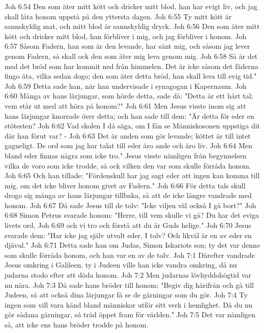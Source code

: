 Joh 6:54  Den som äter mitt kött och dricker mitt blod, han har evigt liv, och jag skall låta honom uppstå på den yttersta dagen.
Joh 6:55  Ty mitt kött är sannskyldig mat, och mitt blod är sannskyldig dryck.
Joh 6:56  Den som äter mitt kött och dricker mitt blod, han förbliver i mig, och jag förbliver i honom.
Joh 6:57  Såsom Fadern, han som är den levande, har sänt mig, och såsom jag lever genom Fadern, så skall ock den som äter mig leva genom mig.
Joh 6:58  Så är det med det bröd som har kommit ned från himmelen. Det är icke såsom det fäderna fingo äta, vilka sedan dogo; den som äter detta bröd, han skall leva till evig tid."
Joh 6:59  Detta sade han, när han undervisade i synagogan i Kapernaum.
Joh 6:60  Många av hans lärjungar, som hörde detta, sade då: "Detta är ett hårt tal; vem står ut med att höra på honom?"
Joh 6:61  Men Jesus visste inom sig att hans lärjungar knorrade över detta; och han sade till dem: "Är detta för eder en stötesten?
Joh 6:62  Vad skolen I då säga, om I fån se Människosonen uppstiga dit där han förut var? -
Joh 6:63  Det är anden som gör levande; köttet är till intet gagneligt. De ord som jag har talat till eder äro ande och äro liv.
Joh 6:64  Men bland eder finnas några som icke tro." Jesus visste nämligen från begynnelsen vilka de voro som icke trodde, så ock vilken den var som skulle förråda honom.
Joh 6:65  Och han tillade: "Fördenskull har jag sagt eder att ingen kan komma till mig, om det icke bliver honom givet av Fadern."
Joh 6:66  För detta tals skull drogo sig många av hans lärjungar tillbaka, så att de icke längre vandrade med honom.
Joh 6:67  Då sade Jesus till de tolv: "Icke viljen väl också I gå bort?"
Joh 6:68  Simon Petrus svarade honom: "Herre, till vem skulle vi gå? Du har det eviga livets ord,
Joh 6:69  och vi tro och förstå att du är Guds helige."
Joh 6:70  Jesus svarade dem: "Har icke jag själv utvalt eder, I tolv? Och likväl är en av eder en djävul."
Joh 6:71  Detta sade han om Judas, Simon Iskariots son; ty det var denne som skulle förråda honom, och han var en av de tolv.
Joh 7:1  Därefter vandrade Jesus omkring i Galileen, ty i Judeen ville han icke vandra omkring, då nu judarna stodo efter att döda honom.
Joh 7:2  Men judarnas lövhyddohögtid var nu nära.
Joh 7:3  Då sade hans bröder till honom: "Begiv dig härifrån och gå till Judeen, så att också dina lärjungar få se de gärningar som du gör.
Joh 7:4  Ty ingen som vill vara känd bland människor utför sitt verk i hemlighet. Då du nu gör sådana gärningar, så träd öppet fram för världen."
Joh 7:5  Det var nämligen så, att icke ens hans bröder trodde på honom.
